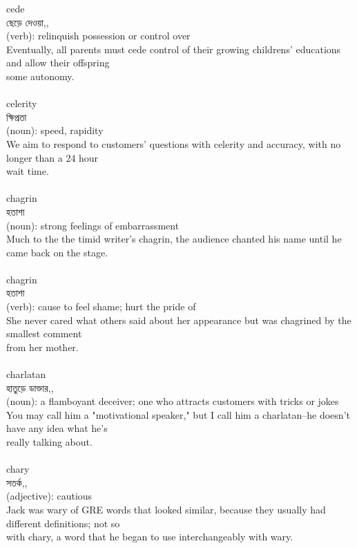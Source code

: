 \documentclass{article}
\begin{document}
{cede}\\
{ছেড়ে দেওয়া,,}\\
{(verb): relinquish possession or control over\\Eventually, all parents must cede control of their growing childrens' educations and allow their offspring\\some autonomy.\\}\\
{celerity}\\
{ক্ষিপ্রতা}\\
{(noun): speed, rapidity\\We aim to respond to customers' questions with celerity and accuracy, with no longer than a 24 hour\\wait time.\\}\\
{chagrin}\\
{হতাশা}\\
{(noun): strong feelings of embarrassment\\Much to the the timid writer's chagrin, the audience chanted his name until he came back on the stage.\\}\\
{chagrin}\\
{হতাশা}\\
{(verb): cause to feel shame; hurt the pride of\\She never cared what others said about her appearance but was chagrined by the smallest comment\\from her mother.\\}\\
{charlatan}\\
{হাতুড়ে ডাক্তার,,}\\
{(noun): a flamboyant deceiver; one who attracts customers with tricks or jokes\\You may call him a "motivational speaker," but I call him a charlatan--he doesn't have any idea what he's\\really talking about.\\}\\
{chary}\\
{সতর্ক,,}\\
{(adjective): cautious\\Jack was wary of GRE words that looked similar, because they usually had different definitions; not so\\with chary, a word that he began to use interchangeably with wary.\\}\\
\end{document}
